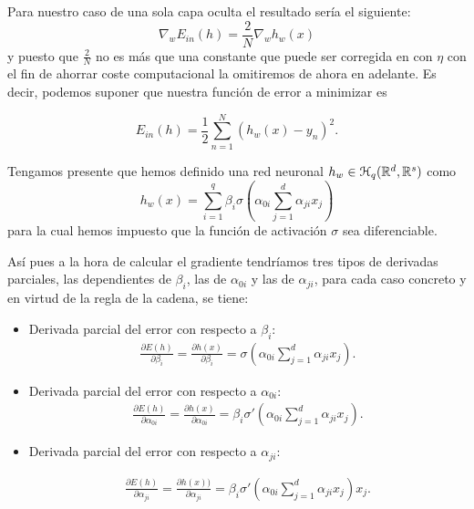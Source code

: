 Para nuestro caso de una sola capa oculta el resultado sería el siguiente: 
\begin{equation}
    \nabla_w E_{in}(h) = \frac{2}{N} \nabla_w h_w(x)
\end{equation}
y puesto que $\frac{2}{N}$ no es más que una constante que 
puede ser corregida en  con $\eta$ con el fin de ahorrar coste computacional la 
omitiremos de ahora en adelante. Es decir, podemos suponer que 
nuestra función de error a minimizar es 

\begin{equation}
    E_{in}(h) = \frac{1}{2} \sum^N_{n=1} (h_w(x)- y_n)^2. 
\end{equation}

Tengamos presente que hemos definido una red neuronal  $h_w \in \mathcal{H}_q (\mathbb{R}^d, \mathbb{R}^s)$ como
\begin{equation}
    h_w(x) = 
    \sum_{i=1}^q \beta_i 
    \sigma
    \left(  
        \alpha_{0 i} 
        \sum_{j=1}^d \alpha_{j i}x_j
    \right)
\end{equation}
para la cual hemos impuesto que la función de activación $\sigma$ sea diferenciable.

Así pues a la hora de calcular el gradiente tendríamos tres tipos de derivadas parciales, las dependientes de $\beta_i$, 
las de $\alpha_{0 i}$ y las de $\alpha_{j i}$, para cada caso concreto y en virtud de la regla de la cadena, se tiene: 
\begin{itemize}
    \item Derivada parcial del error con respecto a $\beta_i$:
    \begin{align} \label{eq:parcial_beta}
        \frac{\partial E(h)}{\partial \beta_i} 
        =
        \frac{\partial h(x)}{\partial \beta_i} 
        = 
        \sigma
    \left(  
        \alpha_{0 i} 
        \sum_{j=1}^d \alpha_{j i}x_j
    \right).
    \end{align}

    \item Derivada parcial del error con respecto a $\alpha_{0 i}$:
    \begin{align} \label{eq:parcial_alpha_cero}
        \frac{\partial E(h)}{\partial \alpha_{0 i}} 
        =
        \frac{\partial h(x)}{\partial \alpha_{0 i}} 
        = 
        \beta_i \sigma'
    \left(  
        \alpha_{0 i} 
        \sum_{j=1}^d \alpha_{j i}x_j
    \right).
    \end{align}

    \item Derivada parcial del error con respecto a $\alpha_{j i}$:
    
    \begin{align} \label{eq:parcial_alpha_i}
        \frac{\partial E(h)}{\partial \alpha_{j i}} 
        =
        \frac{\partial h(x))}{\partial \alpha_{j i}} 
        = 
        \beta_i \sigma'
    \left(  
        \alpha_{0 i} 
        \sum_{j=1}^d \alpha_{j i}x_j
    \right) x_j.
    \end{align}
\end{itemize}  

